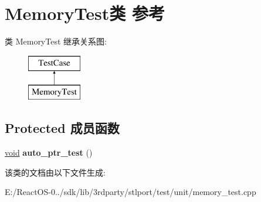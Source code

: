 \hypertarget{class_memory_test}{}\section{Memory\+Test类 参考}
\label{class_memory_test}
类 Memory\+Test 继承关系图\+:\begin{figure}[H]
\begin{center}
\leavevmode
\includegraphics[height=2.000000cm]{class_memory_test}
\end{center}
\end{figure}
\subsection*{Protected 成员函数}
\begin{DoxyCompactItemize}
\item 
\mbox{\label{class_memory_test_ad0ce54ee53ddfc057c55c5c5ed793b5a}} 
\hyperlink{interfacevoid}{void} {\bfseries auto\+\_\+ptr\+\_\+test} ()
\end{DoxyCompactItemize}


该类的文档由以下文件生成\+:\begin{DoxyCompactItemize}
\item 
E\+:/\+React\+O\+S-\/0../sdk/lib/3rdparty/stlport/test/unit/memory\+\_\+test.\+cpp\end{DoxyCompactItemize}

